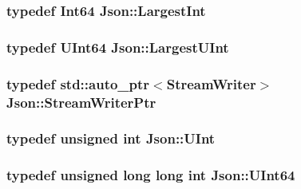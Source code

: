 \subsubsection[{\texorpdfstring{Largest\+Int}{LargestInt}}]{\setlength{\rightskip}{0pt plus 5cm}typedef {\bf Int64} {\bf Json\+::\+Largest\+Int}}\hypertarget{namespaceJson_a218d880af853ce786cd985e82571d297}{}\label{namespaceJson_a218d880af853ce786cd985e82571d297}
\subsubsection[{\texorpdfstring{Largest\+U\+Int}{LargestUInt}}]{\setlength{\rightskip}{0pt plus 5cm}typedef {\bf U\+Int64} {\bf Json\+::\+Largest\+U\+Int}}\hypertarget{namespaceJson_ae202ecad69725e23443f465e257456d0}{}\label{namespaceJson_ae202ecad69725e23443f465e257456d0}
\subsubsection[{\texorpdfstring{Stream\+Writer\+Ptr}{StreamWriterPtr}}]{\setlength{\rightskip}{0pt plus 5cm}typedef std\+::auto\+\_\+ptr$<${\bf Stream\+Writer}$>$ {\bf Json\+::\+Stream\+Writer\+Ptr}}\hypertarget{namespaceJson_a7132404aeebfc96d7c6ad2c66260afb5}{}\label{namespaceJson_a7132404aeebfc96d7c6ad2c66260afb5}
\subsubsection[{\texorpdfstring{U\+Int}{UInt}}]{\setlength{\rightskip}{0pt plus 5cm}typedef unsigned int {\bf Json\+::\+U\+Int}}\hypertarget{namespaceJson_a800fb90eb6ee8d5d62b600c06f87f7d4}{}\label{namespaceJson_a800fb90eb6ee8d5d62b600c06f87f7d4}
\subsubsection[{\texorpdfstring{U\+Int64}{UInt64}}]{\setlength{\rightskip}{0pt plus 5cm}typedef unsigned long long int {\bf Json\+::\+U\+Int64}}\hypertarget{namespaceJson_a01f20bce8f8229f38ff890168c0e6452}{}\label{namespaceJson_a01f20bce8f8229f38ff890168c0e6452}
